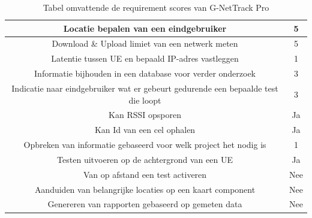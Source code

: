 \begin{table}[!htb]
    \begin{tabular}{| c | c |}
        \hline
        Locatie bepalen van een eindgebruiker & 5 \\
        \hline
        Download \& Upload limiet van een netwerk meten & 5 \\
        \hline
        Latentie tussen UE en bepaald IP-adres vastleggen & 1 \\
        \hline
        Informatie bijhouden in een database voor verder onderzoek & 3 \\
        \hline
        Indicatie naar eindgebruiker wat er gebeurt gedurende een bepaalde test die loopt & 3 \\
        \hline
        Kan RSSI opsporen & Ja \\
        \hline
        Kan Id van een cel ophalen & Ja \\
        \hline
        Opbreken van informatie gebaseerd voor welk project het nodig is & 1 \\
        \hline
        Testen uitvoeren op de achtergrond van een UE & Ja \\
        \hline
        Van op afstand een test activeren & Nee \\
        \hline
        Aanduiden van belangrijke locaties op een kaart component & Nee \\
        \hline
        Genereren van rapporten gebaseerd op gemeten data & Nee \\
        \hline
    \end{tabular}
\caption{Tabel omvattende de requirement scores van G-NetTrack Pro}
\label{fig:TableGNET}
\end{table}

